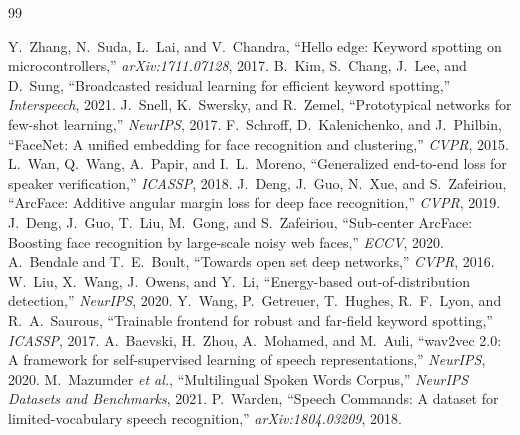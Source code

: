 \documentclass[12pt,a4paper]{report}
\begin{document}
\begin{thebibliography}{99}
\footnotesize

 Y.~Zhang, N.~Suda, L.~Lai, and V.~Chandra,
``Hello edge: Keyword spotting on microcontrollers,'' \emph{arXiv:1711.07128}, 2017.
 B.~Kim, S.~Chang, J.~Lee, and D.~Sung,
``Broadcasted residual learning for efficient keyword spotting,'' \emph{Interspeech}, 2021.
 J.~Snell, K.~Swersky, and R.~Zemel,
``Prototypical networks for few-shot learning,'' \emph{NeurIPS}, 2017.
 F.~Schroff, D.~Kalenichenko, and J.~Philbin,
``FaceNet: A unified embedding for face recognition and clustering,'' \emph{CVPR}, 2015.
 L.~Wan, Q.~Wang, A.~Papir, and I.~L.~Moreno,
``Generalized end-to-end loss for speaker verification,'' \emph{ICASSP}, 2018.
 J.~Deng, J.~Guo, N.~Xue, and S.~Zafeiriou,
``ArcFace: Additive angular margin loss for deep face recognition,'' \emph{CVPR}, 2019.
 J.~Deng, J.~Guo, T.~Liu, M.~Gong, and S.~Zafeiriou,
``Sub-center ArcFace: Boosting face recognition by large-scale noisy web faces,'' \emph{ECCV}, 2020.
 A.~Bendale and T.~E.~Boult,
``Towards open set deep networks,'' \emph{CVPR}, 2016.
 W.~Liu, X.~Wang, J.~Owens, and Y.~Li,
``Energy-based out-of-distribution detection,'' \emph{NeurIPS}, 2020.
 Y.~Wang, P.~Getreuer, T.~Hughes, R.~F.~Lyon, and R.~A.~Saurous,
``Trainable frontend for robust and far-field keyword spotting,'' \emph{ICASSP}, 2017.
 A.~Baevski, H.~Zhou, A.~Mohamed, and M.~Auli,
``wav2vec 2.0: A framework for self-supervised learning of speech representations,'' \emph{NeurIPS}, 2020.
 M.~Mazumder \emph{et al.},
``Multilingual Spoken Words Corpus,'' \emph{NeurIPS Datasets and Benchmarks}, 2021.
 P.~Warden,
``Speech Commands: A dataset for limited-vocabulary speech recognition,'' \emph{arXiv:1804.03209}, 2018.

\end{thebibliography}
\end{document}
